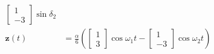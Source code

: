 \documentclass{article}
\renewcommand{\vec}[1]{\boldsymbol{\mathbf{#1}}}
\begin{document}
\begin{enumerate}
\begin{align*}
\begin{bmatrix}
                                                                                      1 \\
                                                                                      -3
                                                                                    \end{bmatrix} \sin \delta_2               \\
          \vec{z}(t)      & = \frac{\alpha}{6} \left( \begin{bmatrix}
                                                          1 \\
                                                          3
                                                        \end{bmatrix} \cos \omega_1 t - \begin{bmatrix}
                                                                                          1 \\
                                                                                          -3
                                                                                        \end{bmatrix} \cos \omega_2 t \right)
        \end{align*}
\end{enumerate}
\end{document}
